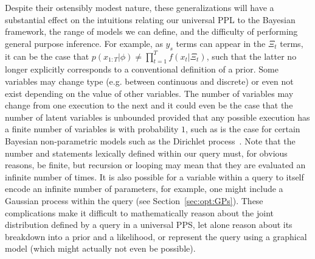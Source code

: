 Despite their ostensibly modest nature,
these generalizations will have a substantial effect on the intuitions relating our universal
PPL to the Bayesian framework, the range of models we can define, and the difficulty of performing
general purpose inference.  For example, as $y_s$ terms can appear in the $\Xi_t$ terms,
it can be the case that $p(x_{1:T} | \phi) \neq \prod_{t=1}^{T} f(x_t | \Xi_t)$, such that the latter no
longer explicitly corresponds to a conventional definition of a prior.  Some variables may change type (e.g.
between continuous and discrete) or even not exist depending on the value of other variables.  The number
of variables may change from one execution to the next and it could even be the case that the number
of latent variables is unbounded provided that any possible execution has a 
finite number of variables is with probability $1$, such
as is the case for certain Bayesian non-parametric models such as the Dirichlet process~\citep{ferguson1973bayesian,teh2011dirichlet,bloemreddy2017rpm}.
Note that the number \sample and \observe statements lexically defined within our query must,
for obvious reasons, be finite, but recursion or looping may mean that they are evaluated an infinite
number of times.  It is also possible for a variable within a query to itself encode an
infinite number of parameters, for example, one might include a Gaussian process within the query (see Section~\ref{sec:opt:GPs}).
These complications make it difficult to mathematically reason about the joint distribution defined by a query in a
universal PPS, let alone reason about its breakdown into a prior and a likelihood, or represent the query
using a graphical model (which might actually not even be possible).

